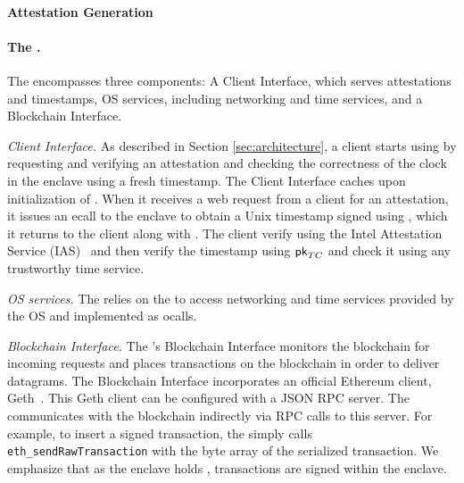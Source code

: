 \paragraph{Attestation Generation} 


\paragraph{The \medname.} The \medname encompasses three components: A Client Interface, which serves attestations and timestamps, OS services, including networking and time services, and a Blockchain Interface. 

\vspace{2mm}

\noindent\emph{Client Interface.} As described in Section \ref{sec:architecture},
a client starts using \tc by requesting and verifying an attestation \att and checking the correctness of the clock in the \tc enclave using a fresh timestamp.
The Client Interface caches \att upon initialization of \engine. When it receives a web request from a client for an attestation,
it issues an ecall to the enclave to obtain a
Unix timestamp signed using \skTC, which it returns to the client along with \att. The client verify \att 
using the Intel Attestation Service (IAS)~\cite{} and then verify the timestamp using ${\sf pk}_{TC}$ and check it using any trustworthy time service. 

\vspace{2mm}

\noindent\emph{OS services.} The \encname relies on the \medname to access networking and 
time services  provided by the OS and implemented as ocalls.

\vspace{2mm}

\noindent\emph{Blockchain Interface.} The \medname's Blockchain Interface monitors the
blockchain for incoming requests and places transactions on the blockchain in order to
deliver datagrams. The Blockchain Interface incorporates an 
official Ethereum client, Geth~\cite{geth}. This Geth client can be configured with a JSON RPC server.  
The \medname  communicates with the blockchain indirectly via RPC calls to this server. For example, to insert a signed transaction, the \medname simply calls
\texttt{eth\_sendRawTransaction} with the byte array of the serialized
transaction. We emphasize that as the enclave holds \skTC, transactions are signed within the enclave.


